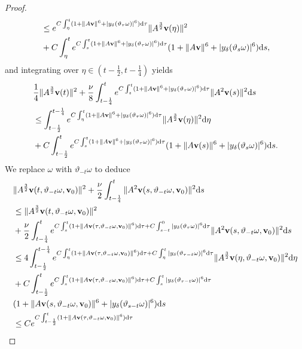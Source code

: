 \documentclass{elsarticle}
\theoremstyle{definition}
\numberwithin{equation}{section}
\renewcommand{\d}{{\rm{d}}}
\begin{document}
\begin{proof}
\begin{align*}
&\leq
e^{C\int_\eta^t(1+\|A\textbf{v}\|^6+|y_\delta(\vartheta_\tau\omega)|^6)\d\tau}\|A^\frac{3}{2}\textbf{v}(\eta)\|^2\nonumber\\
&+C\int_\eta^te^{C\int_s^t(1+\|A\textbf{v}\|^6+|y_\delta(\vartheta_\tau\omega)|^6)\d\tau}
(1+\|A\textbf{v}\|^6+|y_\delta(\vartheta_s\omega)|^6)\d s,
\end{align*}
and integrating over $\eta\in(t-\frac{1}{2},t-\frac{1}{4})$ yields
\begin{align}
&\frac{1}{4}\|A^\frac{3}{2}\textbf{v}(t)\|^2+\frac{\nu}{8}\int_{t-\frac{1}{4}}^te^{C\int_s^t(1+\|A\textbf{v}\|^6+
|y_\delta(\vartheta_\tau\omega)|^6)\d\tau}
\|A^2\textbf{v}(s)\|^2 \d s\nonumber\\
&\leq
\int_{t-\frac{1}{2}}^{t-\frac{1}{4}}e^{C\int_\eta^t(1+\|A\textbf{v}\|^6+|y_\delta(\vartheta_\tau\omega)|^6)\d\tau}
\|A^\frac{3}{2}\textbf{v}(\eta)\|^2\d \eta\nonumber\\
&+C\int_{t-\frac{1}{2}}^te^{C\int_s^t(1+\|A\textbf{v}\|^6+|y_\delta(\vartheta_\tau\omega)|^6)\d\tau}
(1+\|A\textbf{v}(s)\|^6+|y_\delta(\vartheta_s\omega)|^6)\d s.
\end{align}
We replace $\omega$ with $\vartheta_{-t}\omega$ to deduce
\begin{align}\label{6.13}
&\|A^\frac{3}{2}\textbf{v}(t,\vartheta_{-t}\omega,\textbf{v}_0)\|^2+\frac{\nu}{2}\int_{t-\frac{1}{4}}^t
\|A^2\textbf{v}(s,\vartheta_{-t}\omega,\textbf{v}_0)\|^2 \d s\nonumber\\
&\leq\|A^\frac{3}{2}\textbf{v}(t,\vartheta_{-t}\omega,\textbf{v}_0)\|^2\nonumber\\
&+\frac{\nu}{2}\int_{t-\frac{1}{4}}^te^{C\int_s^t(1+\|A\textbf{v}(\tau,\vartheta_{-t}\omega,\textbf{v}_0)\|^6)\d\tau+
C\int_{s-t}^0|y_\delta(\vartheta_\tau\omega)|^6\d\tau}
\|A^2\textbf{v}(s,\vartheta_{-t}\omega,\textbf{v}_0)\|^2 \d s\nonumber\\
&\leq
4\int_{t-\frac{1}{2}}^{t-\frac{1}{4}}e^{C\int_\eta^t(1+\|A\textbf{v}(\tau,\vartheta_{-t}\omega,\textbf{v}_0)\|^6)\d\tau
+C\int_\eta^t|y_\delta(\vartheta_{\tau-t}\omega)|^6\d\tau}
\|A^\frac{3}{2}\textbf{v}(\eta,\vartheta_{-t}\omega,\textbf{v}_0)\|^2\d \eta\nonumber\\
&+C\int_{t-\frac{1}{2}}^te^{C\int_s^t(1+\|A\textbf{v}(\tau,\vartheta_{-t}\omega,\textbf{v}_0)\|^6)\d\tau
+C\int_s^t|y_\delta(\vartheta_{\tau-t}\omega)|^6\d\tau}\nonumber\\
&(1+\|A\textbf{v}(s,\vartheta_{-t}\omega,\textbf{v}_0)\|^6+|y_\delta(\vartheta_{s-t}\omega)|^6)\d s\nonumber\\
&\leq Ce^{C\int_{t-\frac12}^t(1+\|A\textbf{v}(\tau,\vartheta_{-t}\omega,\textbf{v}_0)\|^6)\d\tau
}
\end{align}
\end{proof}
\end{document}
